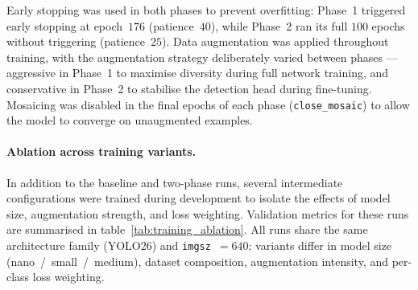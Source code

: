 Early stopping was used in both phases to prevent overfitting: Phase~1
triggered early stopping at epoch~$176$ (patience~$40$), while Phase~2 ran its
full $100$ epochs without triggering (patience~$25$). Data augmentation was
applied throughout training, with the augmentation strategy deliberately varied
between phases --- aggressive in Phase~1 to maximise diversity during full
network training, and conservative in Phase~2 to stabilise the detection head
during fine-tuning. Mosaicing was disabled in the final epochs of each phase
(\texttt{close\_mosaic}) to allow the model to converge on unaugmented
examples.

\paragraph{Ablation across training variants.}

In addition to the baseline and two-phase runs, several intermediate
configurations were trained during development to isolate the effects of model
size, augmentation strength, and loss weighting. Validation metrics for these
runs are summarised in table~\ref{tab:training_ablation}. All runs share the
same architecture family (YOLO26) and \texttt{imgsz}~$=640$; variants differ in
model size (nano~/~small~/~medium), dataset composition, augmentation
intensity, and per-class loss weighting.

